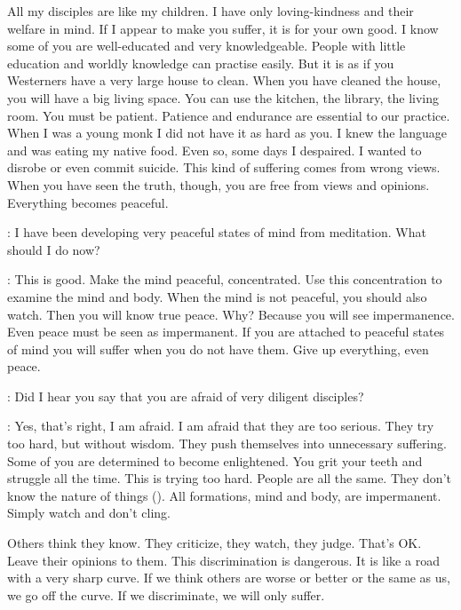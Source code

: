 All my disciples are like my children. I have only loving-kindness and their welfare in mind. If I appear to make you suffer, it is for your own good. I know some of you are well-educated and very knowledgeable. People with little education and worldly knowledge can practise easily. But it is as if you Westerners have a very large house to clean. When you have cleaned the house, you will have a big living space. You can use the kitchen, the library, the living room. You must be patient. Patience and endurance are essential to our practice. When I was a young monk I did not have it as hard as you. I knew the language and was eating my native food. Even so, some days I despaired. I wanted to disrobe or even commit suicide. This kind of suffering comes from wrong views. When you have seen the truth, though, you are free from views and opinions. Everything becomes peaceful.

:
I have been developing very peaceful states of mind from meditation. What should I do now?

: This is good. Make the mind peaceful, concentrated. Use this concentration to examine the mind and body. When the mind is not peaceful, you should also watch. Then you will know true peace. Why? Because you will see impermanence. Even peace must be seen as impermanent. If you are attached to peaceful states of mind you will suffer when you do not have them. Give up everything, even peace.

:
Did I hear you say that you are afraid of very diligent disciples?

: Yes, that's right, I am afraid. I am afraid that they are too serious. They try too hard, but without wisdom. They push themselves into unnecessary suffering. Some of you are determined to become enlightened. You grit your teeth and struggle all the time. This is trying too hard. People are all the same. They don't know the nature of things (). All formations, mind and body, are impermanent. Simply watch and don't cling.

Others think they know. They criticize, they watch, they judge. That's OK. Leave their opinions to them. This discrimination is dangerous. It is like a road with a very sharp curve. If we think others are worse or better or the same as us, we go off the curve. If we discriminate, we will only suffer.

